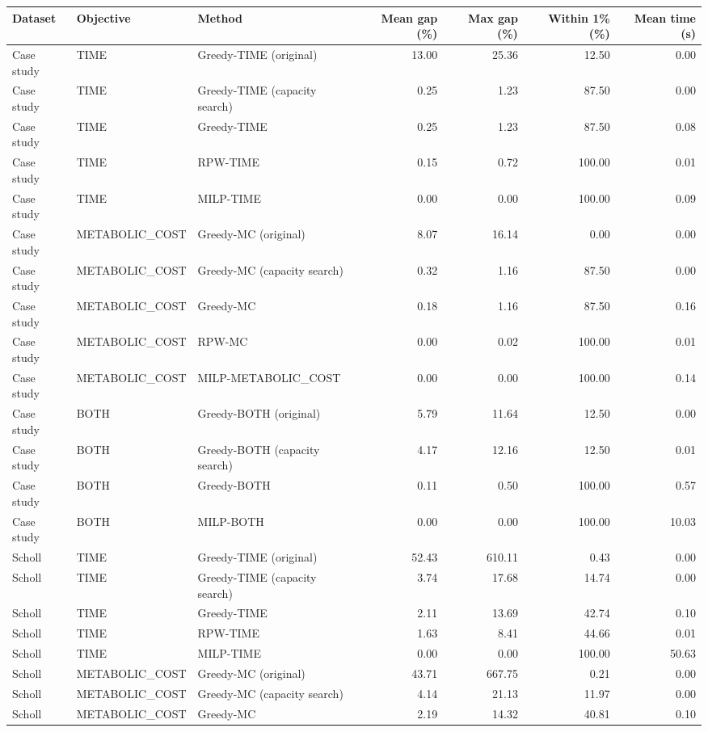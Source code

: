 \begin{tabular}{lllrrrr}
\toprule
Dataset & Objective & Method & Mean gap (\%) & Max gap (\%) & Within 1\% (\%) & Mean time (s) \\
\midrule
Case study & TIME & Greedy-TIME (original) & 13.00 & 25.36 & 12.50 & 0.00 \\
Case study & TIME & Greedy-TIME (capacity search) & 0.25 & 1.23 & 87.50 & 0.00 \\
Case study & TIME & Greedy-TIME & 0.25 & 1.23 & 87.50 & 0.08 \\
Case study & TIME & RPW-TIME & 0.15 & 0.72 & 100.00 & 0.01 \\
Case study & TIME & MILP-TIME & 0.00 & 0.00 & 100.00 & 0.09 \\
Case study & METABOLIC\_COST & Greedy-MC (original) & 8.07 & 16.14 & 0.00 & 0.00 \\
Case study & METABOLIC\_COST & Greedy-MC (capacity search) & 0.32 & 1.16 & 87.50 & 0.00 \\
Case study & METABOLIC\_COST & Greedy-MC & 0.18 & 1.16 & 87.50 & 0.16 \\
Case study & METABOLIC\_COST & RPW-MC & 0.00 & 0.02 & 100.00 & 0.01 \\
Case study & METABOLIC\_COST & MILP-METABOLIC_COST & 0.00 & 0.00 & 100.00 & 0.14 \\
Case study & BOTH & Greedy-BOTH (original) & 5.79 & 11.64 & 12.50 & 0.00 \\
Case study & BOTH & Greedy-BOTH (capacity search) & 4.17 & 12.16 & 12.50 & 0.01 \\
Case study & BOTH & Greedy-BOTH & 0.11 & 0.50 & 100.00 & 0.57 \\
Case study & BOTH & MILP-BOTH & 0.00 & 0.00 & 100.00 & 10.03 \\
Scholl & TIME & Greedy-TIME (original) & 52.43 & 610.11 & 0.43 & 0.00 \\
Scholl & TIME & Greedy-TIME (capacity search) & 3.74 & 17.68 & 14.74 & 0.00 \\
Scholl & TIME & Greedy-TIME & 2.11 & 13.69 & 42.74 & 0.10 \\
Scholl & TIME & RPW-TIME & 1.63 & 8.41 & 44.66 & 0.01 \\
Scholl & TIME & MILP-TIME & 0.00 & 0.00 & 100.00 & 50.63 \\
Scholl & METABOLIC\_COST & Greedy-MC (original) & 43.71 & 667.75 & 0.21 & 0.00 \\
Scholl & METABOLIC\_COST & Greedy-MC (capacity search) & 4.14 & 21.13 & 11.97 & 0.00 \\
Scholl & METABOLIC\_COST & Greedy-MC & 2.19 & 14.32 & 40.81 & 0.10 \\

\end{tabular}
